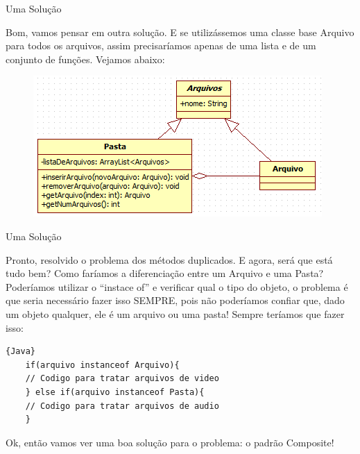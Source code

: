 \documentclass{beamer}
\begin{document}
  \begin{frame}{Uma Solução}

  Bom, vamos pensar em outra solução. E se utilizássemos uma classe base Arquivo para todos os arquivos, assim precisaríamos apenas de uma lista e de um conjunto de funções. Vejamos abaixo:

  \begin{figure}
    \includegraphics[scale=0.8]{composite-errado2.png}
  \end{figure}

  \end{frame}

  \begin{frame}{Uma Solução}

Pronto, resolvido o problema dos métodos duplicados. E agora, será que está tudo bem? Como faríamos a diferenciação entre um Arquivo e uma Pasta? Poderíamos utilizar o “instace of” e verificar qual o tipo do objeto, o problema é que seria necessário fazer isso SEMPRE, pois não poderíamos confiar que, dado um objeto qualquer, ele é um arquivo ou uma pasta! Sempre teríamos que fazer isso:

  \end{frame}

  \begin{frame}[fragile]
    \begin{lstlisting}{Java}
    if(arquivo instanceof Arquivo){ 
    // Codigo para tratar arquivos de video 
    } else if(arquivo instanceof Pasta){ 
    // Codigo para tratar arquivos de audio 
    }
    \end{lstlisting}

\vspace{10px}

Ok, então vamos ver uma boa solução para o problema: o padrão Composite!

  \end{frame}
\end{document}
